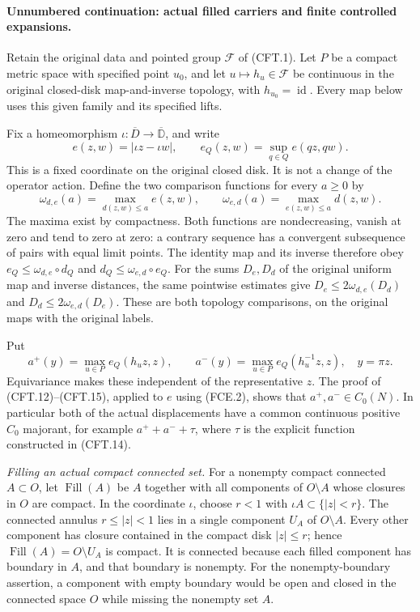 \documentclass[11pt,a4paper]{article}
\DeclareMathOperator{\id}{id}\DeclareMathOperator{\im}{im}
\begin{document}
\paragraph{Unnumbered continuation: actual filled carriers and finite controlled expansions.}
Retain the original data and pointed group $\mathscr F$ of
(CFT.1). Let $P$ be a compact metric space with specified point
$u_0$, and let $u\mapsto h_u\in\mathscr F$ be continuous in
the original closed-disk map-and-inverse topology, with
$h_{u_0}=\id$. Every map below uses this given family and its
specified lifts.

Fix a homeomorphism $\iota:\overline D\to\overline{\mathbb D}$,
and write
\[
 e(z,w)=|\iota z-\iota w|,\qquad
 e_Q(z,w)=\sup_{q\in Q}e(qz,qw).
                                                               \tag{FCE.1}
\]
This is a fixed coordinate on the original closed disk. It is
not a change of the operator action. Define the two comparison
functions for every $a\geq0$ by
\[
 \omega_{d,e}(a)=\max_{d(z,w)\leq a}e(z,w),\qquad
 \omega_{e,d}(a)=\max_{e(z,w)\leq a}d(z,w).
                                                               \tag{FCE.2}
\]
The maxima exist by compactness. Both functions are nondecreasing,
vanish at zero and tend to zero at zero: a contrary sequence has
a convergent subsequence of pairs with equal limit points. The
identity map and its inverse therefore obey
$e_Q\leq\omega_{d,e}\circ d_Q$ and
$d_Q\leq\omega_{e,d}\circ e_Q$. For the sums $D_e,D_d$ of
the original uniform map and inverse distances, the same
pointwise estimates give
$D_e\leq2\omega_{d,e}(D_d)$ and
$D_d\leq2\omega_{e,d}(D_e)$. These are both topology
comparisons, on the original maps with the original labels.

Put
\[
 a^+(y)=\max_{u\in P}e_Q(h_uz,z),\qquad
 a^-(y)=\max_{u\in P}e_Q(h_u^{-1}z,z),\quad y=\pi z.
                                                               \tag{FCE.3}
\]
Equivariance makes these independent of the representative $z$.
The proof of (CFT.12)--(CFT.15), applied to $e$ using (FCE.2),
shows that $a^+,a^-\in C_0(N)$. In particular both of the
actual displacements have a common continuous positive
$C_0$ majorant, for example $a^++a^-+\tau$, where $\tau$
is the explicit function constructed in (CFT.14).

\emph{Filling an actual compact connected set.}
For a nonempty compact connected $A\subset O$, let
$\operatorname{Fill}(A)$ be $A$ together with all components
of $O\setminus A$ whose closures in $O$ are compact.
In the coordinate $\iota$, choose $r<1$ with
$\iota A\subset\{|z|<r\}$. The connected annulus
$r\leq|z|<1$ lies in a single component $U_A$ of
$O\setminus A$. Every other component has closure contained
in the compact disk $|z|\leq r$; hence
$\operatorname{Fill}(A)=O\setminus U_A$ is compact.
It is connected because each filled component has boundary
in $A$, and that boundary is nonempty. For the nonempty-boundary
assertion, a component with empty boundary would be open and
closed in the connected space $O$ while missing the nonempty
set $A$.
\end{document}
